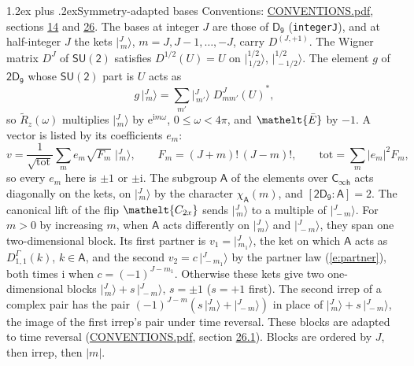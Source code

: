 \documentclass[10pt,a4paper]{article}
\makeatletter
\renewcommand\section{\@startsection{section}{1}{\z@}{-3ex plus -1ex minus -.2ex}%
  {1.2ex plus .2ex}{\normalfont\large\sffamily\bfseries\color{parttitle}}}
\numberwithin{equation}{section}
\newcommand{\eltfont}[1]{{\let\sigma\eltsigma\mathelt{#1}}}
\newcommand{\grp}[1]{\mathsf{#1}}
\newcommand{\elt}[1]{\eltfont{#1}}
\newcommand{\grpindex}[2]{[#1 : #2]}
\newcommand{\iunit}{\mathrm{i}}
\newcommand{\expe}{\mathrm{e}}
\newcommand{\irrJp}[2]{D^{(#1,#2)}}
\newcommand{\repD}[1]{D^{#1}}
\newcommand{\wignerD}[1]{D^{#1}}
\newcommand{\chiA}{\chi_{\grp{A}}}
\newcommand{\conj}[1]{{#1}^{*}}
\newcommand{\jm}[2]{\bigl\lvert{}^{#1}_{\,#2}\bigr\rangle}
\newcommand{\barred}[1]{\bar{#1}}
\newcommand{\lift}[1]{\tilde{#1}}
\makeatother
\begin{document}
\section{Symmetry-adapted bases}\label{s:bases}
Conventions: \href{../../CONVENTIONS.pdf}{CONVENTIONS.pdf}, sections \href{../../../rotation/CONVENTIONS.pdf\#conv.14}{14} and \href{../../CONVENTIONS.pdf\#conv.26}{26}.
\leavevmode\label{n:index.m}\label{n:vector.ket}The bases at integer $J$ are those of \href{../../../rotation/data/pdf/D9.pdf}{$\grp{D_{9}}$} (\texttt{integerJ}), and at half-integer $J$ the kets $\jm{J}{m}$, $m = J, J-1, \dots, -J$, carry $\irrJp{J}{+1}$. \label{n:matrix.wigner}The Wigner matrix $\wignerD{J}$ of $\grp{SU(2)}$ satisfies $\wignerD{1/2}(U) = U$ on $\jm{1/2}{1/2}$, $\jm{1/2}{-1/2}$. The element $g$ of $\grp{2D_{9}}$ whose $\grp{SU(2)}$ part is $U$ acts as
\begin{equation}\label{e:action}g\,\jm{J}{m} = \sum_{m'} \jm{J}{m'}\; \conj{\wignerD{J}_{m m'}(U)},\end{equation}
so $\lift{R}_{z}(\omega)$ multiplies $\jm{J}{m}$ by $\expe^{\iunit m\omega}$, $0 \le \omega < 4\pi$, and $\elt{\barred{E}}$ by $-1$. \label{n:index.ketcoefficient}\label{n:vector.basis.symmetry}\label{n:index.ketweight}\label{n:index.total}A vector is listed by its coefficients $e_m$:
\begin{equation}\label{e:ket}v = \frac{1}{\sqrt{\mathrm{tot}}}\sum_m e_m\sqrt{F_m}\;\jm{J}{m},\qquad F_m = (J+m)!\,(J-m)!,\qquad \mathrm{tot} = \sum_m |e_m|^2F_m,\end{equation}
so every $e_m$ here is $\pm 1$ or $\pm\iunit$.
\leavevmode\label{n:group.A}\label{n:function.character.abelian}The subgroup $\grp{A}$ of the elements over $\grp{C_{\infty h}}$ acts diagonally on the kets, on $\jm{J}{m}$ by the character $\chiA(m)$, and $\grpindex{\grp{2D_{9}}}{\grp{A}} = 2$. The canonical lift of the flip $\elt{C_{2x}}$ sends $\jm{J}{m}$ to a multiple of $\jm{J}{-m}$. For $m > 0$ by increasing $m$, when $\grp{A}$ acts differently on $\jm{J}{m}$ and $\jm{J}{-m}$, they span one two-dimensional block. \label{n:index.partner.sign}Its first partner is $v_1 = \jm{J}{m_1}$, the ket on which $\grp{A}$ acts as $\repD{\Gamma}_{1,1}(k)$, $k \in \grp{A}$, and the second $v_2 = c\,\jm{J}{-m_1}$ by the partner law (\ref{e:partner}), both times $\iunit$ when $c = (-1)^{J-m_1}$. \label{n:index.pair.sign}Otherwise these kets give two one-dimensional blocks $\jm{J}{m} + s\,\jm{J}{-m}$, $s = \pm 1$ ($s = +1$ first). The second irrep of a complex pair has the pair $(-1)^{J-m}(s\,\jm{J}{m} + \jm{J}{-m})$ in place of $\jm{J}{m} + s\,\jm{J}{-m}$, the image of the first irrep's pair under time reversal. These blocks are adapted to time reversal (\href{../../CONVENTIONS.pdf}{CONVENTIONS.pdf}, section \href{../../CONVENTIONS.pdf\#conv.26.1}{26.1}). Blocks are ordered by $J$, then irrep, then $|m|$.
\end{document}
